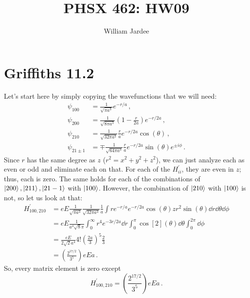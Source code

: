 \documentclass[11pt]{article}
\begin{document}
\title{PHSX 462: HW09}
\author{William Jardee}
\maketitle


\section*{Griffiths 11.2}
Let's start here by simply copying the wavefunctions that we will need:
\begin{align*}
\psi_{100} & = \frac{1}{\sqrt{\pi a^3}}e^{-r/a} \, ,\\
\psi_{200} & = \frac{1}{\sqrt{8\pi a^3}}\left(1 - \frac{r}{2a}\right)e^{-r/2a} \, ,\\
\psi_{210} & = \frac{1}{\sqrt{32\pi a^3}}\frac{r}{a} e^{-r/2a}\cos(\theta) \, ,\\
\psi_{21\pm 1} & = \mp \frac{1}{\sqrt{64 \pi a^3}}\frac{r}{a} e^{-r/2a}\sin(\theta)e^{\pm i\phi} \, .
\end{align*}
Since $r$ has the same degree as $z$ ($r^2 = x^2 + y^2 + z^2$), we can just analyze each as even or odd and eliminate each on that. For each of the $H^\prime_{ii}$, they are even in $z$; thus, each is zero. The same holds for each of the combinations of $\ket{200}, \ket{211}, \ket{21-1}$ with $\ket{100}$. However, the combination of $\ket{210}$ with $\ket{100}$ is not, so let us look at that:
\begin{align*}
H^\prime_{100, 210} & = eE\frac{1}{\sqrt{\pi a^3}}\frac{1}{\sqrt{32 \pi a^3}}\frac{1}{a}\int re^{-r/a} e^{-r/2a}\cos(\theta) z r^2 \sin(\theta) \dd{r}\dd{\theta}\dd{\phi}\\
& = eE \frac{1}{a^4\sqrt{8}\pi}\int^\infty_0 r^4 e^{-3r/2a} \dd{r} \int_0^\pi \cos[2](\theta) \dd{\theta} \int^{2\pi}_0 \dd{\phi}\\
& = \frac{eE}{2\sqrt{2}a^4}4!\left(\frac{2a}{3}\right)^5\frac{2}{3}\\
& = \left(\frac{2^{17/2}}{3^5}\right)eEa \, .
\end{align*}
So, every matrix element is zero except 
\[\boxed{H^\prime_{100, 210} = \left(\frac{2^{17/2}}{3^5}\right)eEa} \, .\]

\newpage
\end{document}
